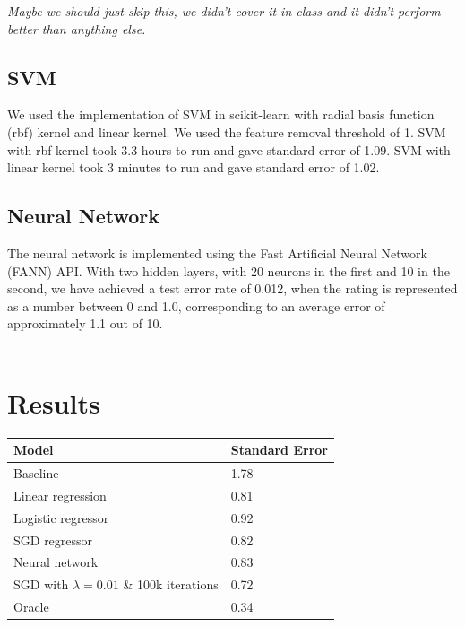 \documentclass[journal]{IEEEtran}
\begin{document}
\textit{Maybe we should just skip this, we didn't cover it in class and it didn't perform better than anything else.}

\subsection{SVM}
We used the implementation of SVM in scikit-learn with radial basis function (rbf) kernel and linear kernel. We used the feature removal threshold of 1. SVM with rbf kernel took 3.3 hours to run and gave standard error of 1.09. SVM with linear kernel took 3 minutes to run and gave standard error of 1.02.

\subsection{Neural Network}
The neural network is implemented using the Fast Artificial Neural Network (FANN)
API.  With two hidden layers, with 20 neurons in the first and 10 in the second, 
we have achieved a test error rate of 0.012, when the rating is represented as a
number between 0 and 1.0, corresponding to an average error of approximately 1.1 out of 10.  \\
\\

\section{Results}
\smallskip
\begin{center}
\begin{tabular}{|l | l|} %
\hline
Model               & Standard Error  \\ [0.5ex] %
\hline
Baseline            & 1.78 \\
\hline
Linear regression  & 0.81 \\
Logistic regressor  & 0.92 \\
SGD regressor       & 0.82 \\
Neural network      & 0.83 \\
SGD with $ \lambda = 0.01 $ \& 100k iterations & 0.72 \\
\hline
Oracle              & 0.34 \\
\hline %
\end{tabular}
\end{center}
\smallskip
\end{document}
